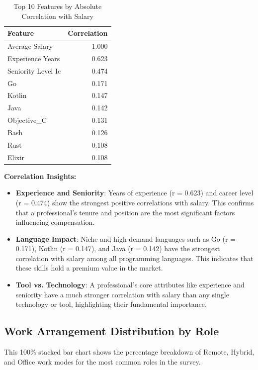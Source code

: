 \documentclass[12pt,a4paper]{article}
\begin{document}
\begin{table}[H]
	\centering
	\small
	\begin{tabular}{lr}
		\toprule
		\textbf{Feature}   & \textbf{Correlation} \\
		\midrule
		Average Salary     & 1.000                \\
		Experience Years   & 0.623                \\
		Seniority Level Ic & 0.474                \\
		Go                 & 0.171                \\
		Kotlin             & 0.147                \\
		Java               & 0.142                \\
		Objective\_C       & 0.131                \\
		Bash               & 0.126                \\
		Rust               & 0.108                \\
		Elixir             & 0.108                \\
		\bottomrule
	\end{tabular}
	\caption{Top 10 Features by Absolute Correlation with Salary}
\end{table}

\textbf{Correlation Insights:}
\begin{itemize}
	\item \textbf{Experience and Seniority}: Years of experience (r = 0.623) and career level (r = 0.474) show the strongest positive correlations with salary. This confirms that a professional’s tenure and position are the most significant factors influencing compensation.
	\item \textbf{Language Impact}: Niche and high-demand languages such as Go (r = 0.171), Kotlin (r = 0.147), and Java (r = 0.142) have the strongest correlation with salary among all programming languages. This indicates that these skills hold a premium value in the market.
	\item \textbf{Tool vs. Technology}: A professional’s core attributes like experience and seniority have a much stronger correlation with salary than any single technology or tool, highlighting their fundamental importance.
\end{itemize}

\subsection{Work Arrangement Distribution by Role}
This 100\% stacked bar chart shows the percentage breakdown of Remote, Hybrid, and Office work modes for the most common roles in the survey.
\end{document}
